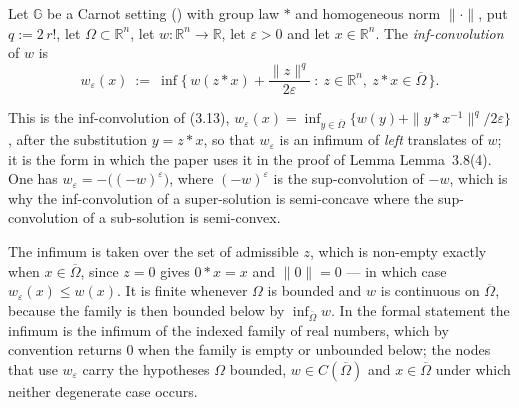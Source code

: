 \begin{definition}
Let $\mathbb G$ be a Carnot setting () with group law $*$ and
homogeneous norm $\|\cdot\|$, put $q:=2\,r!$, let $\Omega\subset\mathbb R^n$, let
$w:\mathbb R^n\to\mathbb R$, let $\varepsilon>0$ and let $x\in\mathbb R^n$. The
\emph{inf-convolution} of $w$ is
\[
 w_{\varepsilon}(x)\ :=\ \inf\Big\{\,w(z*x)+\frac{\|z\|^{q}}{2\varepsilon}\ :\
   z\in\mathbb R^n,\ z*x\in\overline\Omega\,\Big\} .
\]

This is the inf-convolution of (3.13),
$w_{\varepsilon}(x)=\inf_{y\in\overline\Omega}\{w(y)+\|y*x^{-1}\|^{q}/2\varepsilon\}$,
after the substitution $y=z*x$, so that $w_{\varepsilon}$ is an infimum of \emph{left}
translates of $w$; it is the form in which the paper uses it in the proof of Lemma
Lemma~3.8(4). One has $w_{\varepsilon}=-\big((-w)^{\varepsilon}\big)$, where
$(-w)^{\varepsilon}$ is the sup-convolution of $-w$, which is why the inf-convolution of a
super-solution is semi-concave where the sup-convolution of a sub-solution is
semi-convex.

The infimum is taken over the set of admissible $z$, which is non-empty exactly when
$x\in\overline\Omega$, since $z=0$ gives $0*x=x$ and $\|0\|=0$ --- in which case
$w_{\varepsilon}(x)\le w(x)$. It is finite whenever $\Omega$ is bounded and $w$ is
continuous on $\overline\Omega$, because the family is then bounded below by
$\inf_{\overline\Omega}w$. In the formal statement the infimum is the infimum of the
indexed family of real numbers, which by convention returns $0$ when the family is empty or
unbounded below; the nodes that use $w_{\varepsilon}$ carry the hypotheses $\Omega$
bounded, $w\in C(\overline\Omega)$ and $x\in\overline\Omega$ under which neither
degenerate case occurs.
\end{definition}
